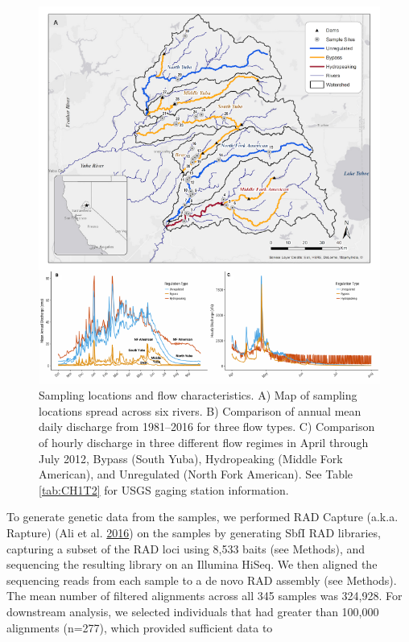 \documentclass[twoside,12pt,final]{ucthesis-CA2012} %
\begin{document}
\begin{ucmainmatter}
\begin{figure}
\includegraphics[width=1\linewidth]{figure/ch1/fig_01_ac_map_hydrographs} \caption{Sampling locations and flow characteristics. A) Map of
sampling locations spread across six rivers. B) Comparison of annual
mean daily discharge from 1981--2016 for three flow types. C) Comparison
of hourly discharge in three different flow regimes in April through
July 2012, Bypass (South Yuba), Hydropeaking (Middle Fork American), and
Unregulated (North Fork American). See Table \ref{tab:CH1T2} for USGS
gaging station information.}\label{fig:CH1F1map}
\end{figure}
To generate genetic data from the samples, we performed RAD Capture
(a.k.a. Rapture) (Ali et al. \protect\hyperlink{ref-ali_rad_2016}{2016})
on the samples by generating SbfI RAD libraries, capturing a subset of
the RAD loci using 8,533 baits (see Methods), and sequencing the
resulting library on an Illumina HiSeq. We then aligned the sequencing
reads from each sample to a de novo RAD assembly (see Methods). The mean
number of filtered alignments across all 345 samples was 324,928. For
downstream analysis, we selected individuals that had greater than
100,000 alignments (n=277), which provided sufficient data to

\end{ucmainmatter}
\end{document}
